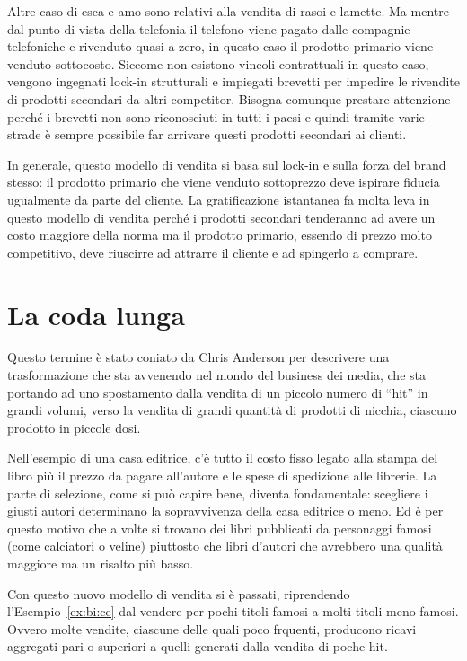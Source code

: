 Altre caso di esca e amo sono relativi alla vendita di rasoi e lamette. Ma
mentre dal punto di vista della telefonia il telefono viene pagato dalle
compagnie telefoniche e rivenduto quasi a zero, in questo caso il prodotto
primario viene venduto sottocosto. Siccome non esistono vincoli contrattuali in
questo caso, vengono ingegnati lock-in strutturali e impiegati brevetti per
impedire le rivendite di prodotti secondari da altri competitor. Bisogna
comunque prestare attenzione perché i brevetti non sono riconosciuti in tutti i
paesi e quindi tramite varie strade è sempre possibile far arrivare questi
prodotti secondari ai clienti.

In generale, questo modello di vendita si basa sul lock-in e sulla forza del
brand stesso: il prodotto primario che viene venduto sottoprezzo deve ispirare
fiducia ugualmente da parte del cliente. La gratificazione istantanea fa molta
leva in questo modello di vendita perché i prodotti secondari tenderanno ad
avere un costo maggiore della norma ma il prodotto primario, essendo di prezzo
molto competitivo, deve riuscirre ad attrarre il cliente e ad spingerlo a
comprare.

\section{La coda lunga}

Questo termine è stato coniato da Chris Anderson per descrivere una
trasformazione che sta avvenendo nel mondo del business dei media, che sta
portando ad uno spostamento dalla vendita di un piccolo numero di ``hit'' in
grandi volumi, verso la vendita di grandi quantità di prodotti di nicchia,
ciascuno prodotto in piccole dosi.

\begin{example}\label{ex:bi:ce}
Nell'esempio di una casa editrice, c'è tutto il costo fisso legato alla
stampa del libro più il prezzo da pagare all'autore e le spese di spedizione
alle librerie. La parte di selezione, come si può capire bene, diventa
fondamentale: scegliere i giusti autori determinano la sopravvivenza della casa
editrice o meno. Ed è per questo motivo che a volte si trovano dei libri
pubblicati da personaggi famosi (come calciatori o veline) piuttosto che libri
d'autori che avrebbero una qualità maggiore ma un risalto più basso.
\end{example}

Con questo nuovo modello di vendita si è passati, riprendendo
l'Esempio~\ref{ex:bi:ce} dal vendere per pochi titoli famosi a molti titoli
meno famosi. Ovvero molte vendite, ciascune delle quali poco frquenti,
producono ricavi aggregati pari o superiori a quelli generati dalla vendita di
poche hit.

